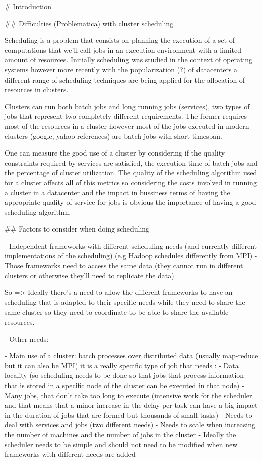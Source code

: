 
# Introduction

## Difficulties (Problematica) with cluster scheduling

Scheduling is a problem that consists on planning the execution of a
set of computations that we'll call jobs in an execution environment
with a limited amount of resources. Initially scheduling was studied
in the context of operating systems however more recently with the
popularization (?) of datacenters a different range of scheduling
techniques are being applied for the allocation of resources in
clusters. 

Clusters can run both batch jobs and long running jobs (services), two
types of jobs that represent two completely different requirements.
The former requires most of the resources in a cluster however most of
the jobs executed in modern clusters (google, yahoo references) are
batch jobs with short timespan.

One can measure the good use of a cluster by considering if the
quality constraints required by services are satisfied, the execution
time of batch jobs and the percentage of cluster utilization. The
quality of the scheduling algorithm used for a cluster affects all of
this metrics so considering the costs involved in running a cluster in
a datacenter and the impact in bussiness terms of having the
appropriate quality of service for jobs is obvious the importance of
having a good scheduling algorithm. 


## Factors to consider when doing scheduling

- Independent frameworks with different scheduling needs (and
  currently different implementations  of the scheduling) (e.g Hadoop
  schedules differently from MPI)
- Those frameworks need to access the same data (they cannot run in
different clusters or otherwise they'll need to replicate the data)

So => Ideally there's a need to allow the different frameworks to have an
scheduling that is adapted to their specific needs while they need to
share the same cluster so they need to coordinate to be able to share
the available resources.

- Other needs:

 - Main use of a cluster: batch processes over distributed data
   (usually map-reduce but it can also be MPI) it is a really specific
   type of job that needs :
     - Data locality (so scheduling needs to be done so that jobs that
     process information that is stored in a specific node of the
     cluster can be executed in that node)
     - Many jobs, that don't take too long to execute (intensive work
     for the scheduler and that means that a minor increase in the
     delay per-task can have a big impact in the duration of jobs that
     are formed but thousands of small tasks)
 - Needs to deal with services and jobs (two different needs)
 - Needs to scale when increasing the number of machines and the
   number of jobs in the cluster
 - Ideally the scheduler needs to be simple and should not need to be
   modified when new frameworks with different needs are added

